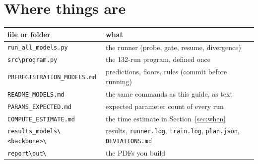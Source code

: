 \documentclass[10.5pt,a4paper]{article}
\newcommand{\cmd}[1]{\texttt{#1}}
\begin{document}
\section*{Where things are}
\begin{center}\small
\begin{tabular}{l l}
\toprule
file or folder & what \\
\midrule
\cmd{run\_all\_models.py} & the runner (probe, gate, resume, divergence) \\
\cmd{src\textbackslash program.py} & the 132-run program, defined once \\
\cmd{PREREGISTRATION\_MODELS.md} & predictions, floors, rules (commit before running) \\
\cmd{README\_MODELS.md} & the same commands as this guide, as text \\
\cmd{PARAMS\_EXPECTED.md} & expected parameter count of every run \\
\cmd{COMPUTE\_ESTIMATE.md} & the time estimate in Section~\ref{sec:when} \\
\cmd{results\_models\textbackslash<backbone>\textbackslash} & results, \cmd{runner.log}, \cmd{train.log}, \cmd{plan.json}, \cmd{DEVIATIONS.md} \\
\cmd{report\textbackslash out\textbackslash} & the PDFs you build \\
\bottomrule
\end{tabular}
\end{center}
\end{document}
